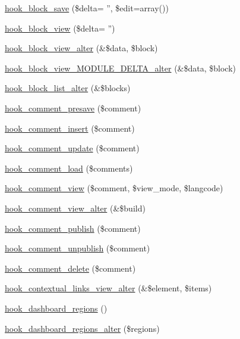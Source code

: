 \begin{DoxyCompactItemize}
\item 
\hyperlink{group__hooks_ga622024ce4f818c241ca7a765e829f928}{hook\_\-block\_\-save} (\$delta= '', \$edit=array())
\item 
\hyperlink{group__hooks_gaa14092a3e74cdc57aa295100cfd6860d}{hook\_\-block\_\-view} (\$delta= '')
\item 
\hyperlink{group__hooks_ga65868e8e24bb04e5eb9e533c4d413b10}{hook\_\-block\_\-view\_\-alter} (\&\$data, \$block)
\item 
\hyperlink{group__hooks_ga8888fb6b153c6a93238eebf2be51eb18}{hook\_\-block\_\-view\_\-MODULE\_\-DELTA\_\-alter} (\&\$data, \$block)
\item 
\hyperlink{group__hooks_gaf38c7633b52b18831e3ec0459d8e9f41}{hook\_\-block\_\-list\_\-alter} (\&\$blocks)
\item 
\hyperlink{group__hooks_gaaa06736884e98ef79711f70af9d1a266}{hook\_\-comment\_\-presave} (\$comment)
\item 
\hyperlink{group__hooks_ga3f972e92f09b1c9e8797fc9037e8c75d}{hook\_\-comment\_\-insert} (\$comment)
\item 
\hyperlink{group__hooks_ga63e0b41e7dbaadbf352b0a9c246d5ae5}{hook\_\-comment\_\-update} (\$comment)
\item 
\hyperlink{group__hooks_gafc29ce3a5bfc4778125ee3099850d96c}{hook\_\-comment\_\-load} (\$comments)
\item 
\hyperlink{group__hooks_gab162cbd3dc1b0395011df47ca3f98aa3}{hook\_\-comment\_\-view} (\$comment, \$view\_\-mode, \$langcode)
\item 
\hyperlink{group__hooks_ga092d794b204b6db107a5f763ac1be659}{hook\_\-comment\_\-view\_\-alter} (\&\$build)
\item 
\hyperlink{group__hooks_ga4c4be9019e5cc7f92e8ccc03b595a64b}{hook\_\-comment\_\-publish} (\$comment)
\item 
\hyperlink{group__hooks_gaed97e1a1eaedd7b482f881ea2b8a3876}{hook\_\-comment\_\-unpublish} (\$comment)
\item 
\hyperlink{group__hooks_gab8d94c5665313a2d174628cc219f0395}{hook\_\-comment\_\-delete} (\$comment)
\item 
\hyperlink{group__hooks_ga30ebdd98be1d239b608b769bda0ca9f0}{hook\_\-contextual\_\-links\_\-view\_\-alter} (\&\$element, \$items)
\item 
\hyperlink{group__hooks_ga533120daedea0c0bfd332400aab41ae2}{hook\_\-dashboard\_\-regions} ()
\item 
\hyperlink{group__hooks_gaf5148b413ca475e8d5246dad5357b918}{hook\_\-dashboard\_\-regions\_\-alter} (\$regions)

\end{DoxyCompactItemize}
